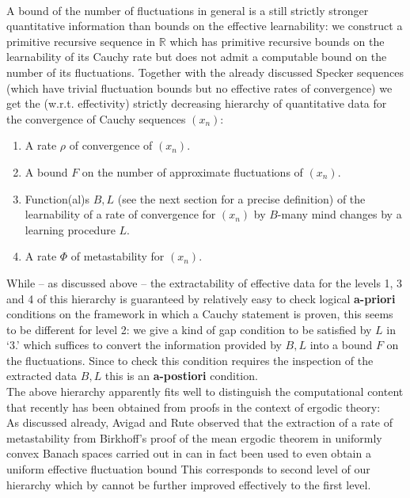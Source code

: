 \documentclass[1p]{elsarticle}
\newcommand{\RR}{\ensuremath{\mathbb{R}}}
\theoremstyle{plain}
\theoremstyle{definition}
\theoremstyle{remark}
\theoremstyle{definition}
\begin{document}
\\[2mm]
A bound of the number of fluctuations in general is a still  
strictly stronger quantitative information than bounds on the effective 
learnability: we construct a primitive recursive sequence in $\RR$ which 
has primitive recursive bounds on the learnability of its Cauchy rate 
but does not admit a computable bound on the number of its fluctuations.
Together with the already discussed Specker sequences (which have 
trivial fluctuation bounds but no effective rates of convergence) 
we get the (w.r.t. effectivity) strictly decreasing hierarchy of 
quantitative data for the convergence of Cauchy sequences $(x_n)$:
\begin{enumerate}
\item 
A rate $\rho$ of convergence of $(x_n).$
\item 
A bound $F$ on the number of approximate fluctuations of $(x_n).$
\item 
Function(al)s $B,L$ (see the next section for a precise definition) 
of the learnability of a rate of convergence for $(x_n)$ by 
$B$-many mind changes by a learning procedure $L.$
\item 
A rate $\Phi$ of metastability for $(x_n).$
\end{enumerate}   
While -- as discussed above -- the extractability of effective data 
for the levels 1, 3 and 4 of this hierarchy is guaranteed by 
relatively easy to check logical {\bf a-priori}  
conditions on the framework in which a Cauchy statement is proven, 
this seems to be different for level 2: we give a kind of gap condition 
to be satisfied by $L$ in `3.' which suffices to convert the 
information provided by $B,L$ into a bound $F$ on the fluctuations. 
Since to check this condition requires the inspection of the extracted 
data $B,L$ this is an {\bf a-postiori} condition.
\\[2mm] 
The above hierarchy apparently fits well to distinguish the 
computational content that recently has been obtained from proofs 
in the context of ergodic theory: \\[1mm] 
As discussed already, Avigad and Rute \cite{Avigad/Rute} observed 
that the extraction of a rate of metastability from Birkhoff's 
proof of the mean ergodic theorem in uniformly convex Banach 
spaces carried out in \cite{Kohlenbach/Leustean4} can in fact been 
used to even obtain a uniform effective fluctuation bound 
This corresponds to second level of our hierarchy 
which by \cite{Avigad/Gerhardy/Towsner} 
cannot be further improved effectively to the first level.
\end{document}
